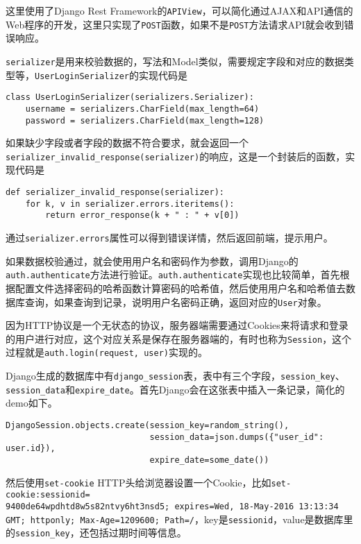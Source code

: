 这里使用了Django Rest Framework的\texttt{APIView}，可以简化通过AJAX和API通信的Web程序的开发，这里只实现了\texttt{POST}函数，如果不是\texttt{POST}方法请求API就会收到错误响应。

\texttt{serializer}是用来校验数据的，写法和Model类似，需要规定字段和对应的数据类型等，\texttt{UserLoginSerializer}的实现代码是

\begin{verbatim}
class UserLoginSerializer(serializers.Serializer):
    username = serializers.CharField(max_length=64)
    password = serializers.CharField(max_length=128)
\end{verbatim}

如果缺少字段或者字段的数据不符合要求，就会返回一个\\\texttt{serializer\_invalid\_response(serializer)}的响应，这是一个封装后的函数，实现代码是

\begin{verbatim}
def serializer_invalid_response(serializer):
    for k, v in serializer.errors.iteritems():
        return error_response(k + " : " + v[0])
\end{verbatim}

通过\texttt{serializer.errors}属性可以得到错误详情，然后返回前端，提示用户。

如果数据校验通过，就会使用用户名和密码作为参数，调用Django的\texttt{auth.authenticate}方法进行验证。\texttt{auth.authenticate}实现也比较简单，首先根据配置文件选择密码的哈希函数计算密码的哈希值，然后使用用户名和哈希值去数据库查询，如果查询到记录，说明用户名密码正确，返回对应的\texttt{User}对象。

因为HTTP协议是一个无状态的协议，服务器端需要通过Cookies来将请求和登录的用户进行对应，这个对应关系是保存在服务器端的，有时也称为\texttt{Session}，这个过程就是\texttt{auth.login(request, user)}实现的。

Django生成的数据库中有\texttt{django\_session}表，表中有三个字段，\texttt{session\_key}、\texttt{session\_data}和\texttt{expire\_date}。首先Django会在这张表中插入一条记录，简化的demo如下。

\begin{verbatim}
DjangoSession.objects.create(session_key=random_string(), 
                             session_data=json.dumps({"user_id": user.id}), 
                             expire_date=some_date())
\end{verbatim}

然后使用\texttt{set-cookie} HTTP头给浏览器设置一个Cookie，比如\texttt{set-cookie:sessionid=\\9400de64wpdhtd8w5s82ntvy6ht3nsd5; expires=Wed, 18-May-2016 13:13:34 GMT; httponly; Max-Age=1209600; Path=/}，key是\texttt{sessionid}，value是数据库里的\texttt{session\_key}，还包括过期时间等信息。

